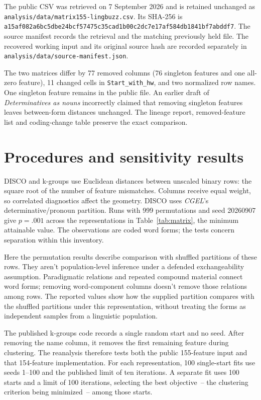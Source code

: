 \documentclass[12pt]{article}
\begin{document}
The public CSV was retrieved on 7 September 2026 and is retained unchanged as \nolinkurl{analysis/data/matrix155-lingbuzz.csv}. Its SHA-256 is \nolinkurl{a15af082a6bc5dbe24bcf57475c35cad1b00c2dc7e17af584db1841bf7abddf7}. The source manifest records the retrieval and the matching previously held file. The recovered working input and its original source hash are recorded separately in \nolinkurl{analysis/data/source-manifest.json}.

The two matrices differ by 77 removed columns (76 singleton features and one all-zero feature), 11 changed cells in \nolinkurl{Start_with_hw}, and two normalized row names. One singleton feature remains in the public file. An earlier draft of \textit{Determinatives as nouns} incorrectly claimed that removing singleton features leaves between-form distances unchanged. The lineage report, removed-feature list and coding-change table preserve the exact comparison.

\section{Procedures and sensitivity results}

DISCO and k-groups use Euclidean distances between unscaled binary rows: the square root of the number of feature mismatches. Columns receive equal weight, so correlated diagnostics affect the geometry. DISCO uses \textit{CGEL}'s determinative/pronoun partition. Runs with 999 permutations and seed 20260907 give \mbox{$p=.001$} across the representations in Table~\ref{tab:matrix}, the minimum attainable value. The observations are coded word forms; the tests concern separation within this inventory.

Here the permutation results describe comparison with shuffled partitions of these rows. They aren't population-level inference under a defended exchangeability assumption. Paradigmatic relations and repeated compound material connect word forms; removing word-component columns doesn't remove those relations among rows. The reported values show how the supplied partition compares with the shuffled partitions under this representation, without treating the forms as independent samples from a linguistic population.

The published k-groups code records a single random start and no seed. After removing the name column, it removes the first remaining feature during clustering. The reanalysis therefore tests both the public 155-feature input and that 154-feature implementation. For each representation, 100 single-start fits use seeds 1--100 and the published limit of ten iterations. A separate fit uses 100 starts and a limit of 100 iterations, selecting the best objective~-- the clustering criterion being minimized~-- among those starts.
\end{document}
